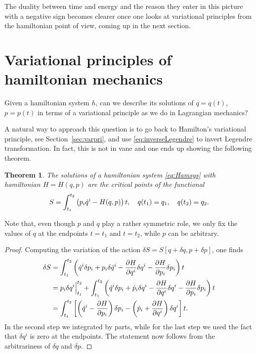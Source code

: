 \documentclass[english,fontsize=11pt,paper=a5,oneside]{scrbook}
\let\d\relax
\newcommand{\d}{\mathrm{d}}
\newtheorem{theorem}{Theorem}[chapter]
\theoremstyle{definition}
\begin{document}
The duality between time and energy and the reason they enter in this picture with a negative sign becomes clearer once one looks at variational principles from the hamiltonian point of view, coming up in the next section.

\section{Variational principles of hamiltonian mechanics}

Given a hamiltonian system $h$, can we describe its solutions of $q=q(t)$, $p=p(t)$ in terms of a variational principle as we do in Lagrangian mechanics?

A natural way to approach this question is to go back to Hamilton's variational principle, see Section~\ref{sec:varpri}, and use \eqref{eq:inverseLegendre} to invert Legendre transformation.
In fact, this is not in vane and one ends up showing the following theorem.

\begin{theorem}\label{thm:variationalHamilton}
  The solutions of a hamiltonian system \eqref{eq:Hamsys} with hamiltonian $H=H(q,p)$ are the critical points of the functional
  \begin{equation}\label{eq:variationalHamilton}
    S = \int_{t_1}^{t_2} \left(p_i\dot q^i - H(q,p)\right) \d t,
    \quad q(t_1) = q_1, \quad q(t_2) = q_2.
  \end{equation}
\end{theorem}
Note that, even though $p$ and $q$ play a rather symmetric role, we only fix the values of $q$ at the endpoints $t=t_1$ and $t=t_2$, while $p$ can be arbitrary.

\begin{proof}
  Computing the variation of the action $\delta S = S[q+\delta q, p + \delta p]$, one finds
  \begin{align}
    \delta S
     & = \int_{t_1}^{t_2} \left( \dot q^i \delta p_i + p_i \delta \dot q^i - \frac{\partial H}{\partial q^i}\delta q^i - \frac{\partial H}{\partial p_i}\delta p_i \right) \d t                                   \\
     & = p_i \delta q^i\Big|_{t_1}^{t_2} + \int_{t_1}^{t_2} \left( \dot q^i \delta p_i + \dot p_i \delta q^i - \frac{\partial H}{\partial q^i}\delta q^i - \frac{\partial H}{\partial p_i}\delta p_i \right) \d t \\
     & = \int_{t_1}^{t_2} \left[
      \left(\dot q^i - \frac{\partial H}{\partial p_i} \right) \delta p_i
      - \left(\dot p_i + \frac{\partial H}{\partial q^i}\right) \delta q^i
      \right] \d t.
  \end{align}
  In the second step we integrated by parts, while for the last step we used the fact that $\delta q^i$ is zero at the endpoints.
  The statement now follows from the arbitrariness of $\delta q$ and $\delta p$.
\end{proof}
\end{document}

